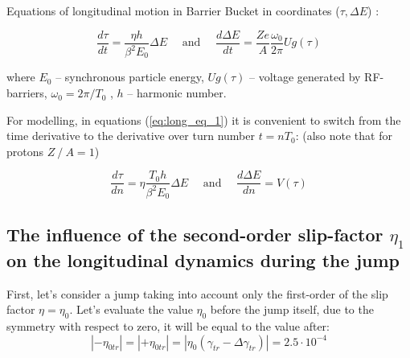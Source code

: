 \documentclass[a4paper,
               keeplastbox,   %
               ]{jacow}
\begin{document}
Equations of longitudinal motion in Barrier Bucket in coordinates ($\tau,\Delta E$) \cite{Hans}:

\begin{equation}\label{eq:long_eq_1}
\frac{d \tau}{d t}=\frac{\eta h}{\beta^{2} E_{0}} \Delta E \quad \text { and } \quad \frac{d \Delta E}{d t}=\frac{Z e}{A} \frac{\omega_{0}}{2 \pi} U g(\tau)
\end{equation}

where $E_0$ – synchronous particle energy, $Ug(\tau)$ – voltage generated by RF-barriers, $\omega_{0}=2\pi/T_{0}$ , $h$ – harmonic number.
\par For modelling, in equations (\ref{eq:long_eq_1}) it is convenient to switch from the time derivative to the derivative over turn number $t=nT_{0}$: (also note that for protons $Z⁄A=1$)

\begin{equation}\label{eq:long_eq_2}
\frac{d \tau}{d n}=\eta \frac{T_{0} h}{\beta^{2} E_{0}} \Delta E \quad \text { and } \quad \frac{d \Delta E}{d n}=V(\tau)
\end{equation}

\subsection{The influence of the second-order slip-factor  $\eta_{1}$ on the longitudinal dynamics during the jump}

First, let's consider a jump taking into account only the first-order of the slip factor $\eta=\eta_{0}$. Let's evaluate the value $\eta_{0}$ before the jump itself, due to the symmetry with respect to zero, it will be equal to the value after:
$$
\left|-\eta_{0 t r}\right|=\left|+\eta_{0 t r}\right|=\left|\eta_{0}\left(\gamma_{t r}-\Delta \gamma_{t r}\right)\right|=2.5 \cdot 10^{-4}
$$
\end{document}

